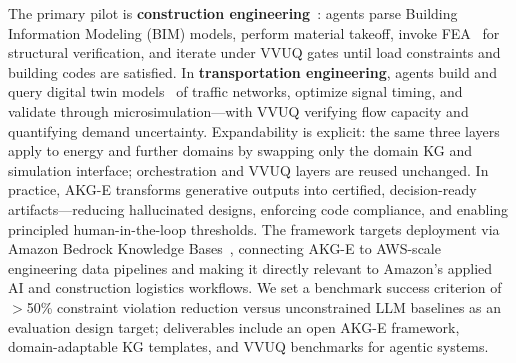 \documentclass[conference, 10pt]{IEEEtran}
\begin{document}
The primary pilot is \textbf{construction engineering}~\cite{Eastman2011BIM}: agents parse Building Information Modeling (BIM) models, perform material takeoff, invoke FEA~\cite{Logg2012FEniCS} for structural verification, and iterate under VVUQ gates until load constraints and building codes are satisfied. In \textbf{transportation engineering}, agents build and query digital twin models~\cite{Tao2019DigitalTwin} of traffic networks, optimize signal timing, and validate through microsimulation---with VVUQ verifying flow capacity and quantifying demand uncertainty. Expandability is explicit: the same three layers apply to energy and further domains by swapping only the domain KG and simulation interface; orchestration and VVUQ layers are reused unchanged. In practice, AKG-E transforms generative outputs into certified, decision-ready artifacts---reducing hallucinated designs, enforcing code compliance, and enabling principled human-in-the-loop thresholds. The framework targets deployment via Amazon Bedrock Knowledge Bases~\cite{AWSBedrockHybridSearch2024}, connecting AKG-E to AWS-scale engineering data pipelines and making it directly relevant to Amazon's applied AI and construction logistics workflows. We set a benchmark success criterion of $>$50\% constraint violation reduction versus unconstrained LLM baselines as an evaluation design target; deliverables include an open AKG-E framework, domain-adaptable KG templates, and VVUQ benchmarks for agentic systems.



\end{document}
